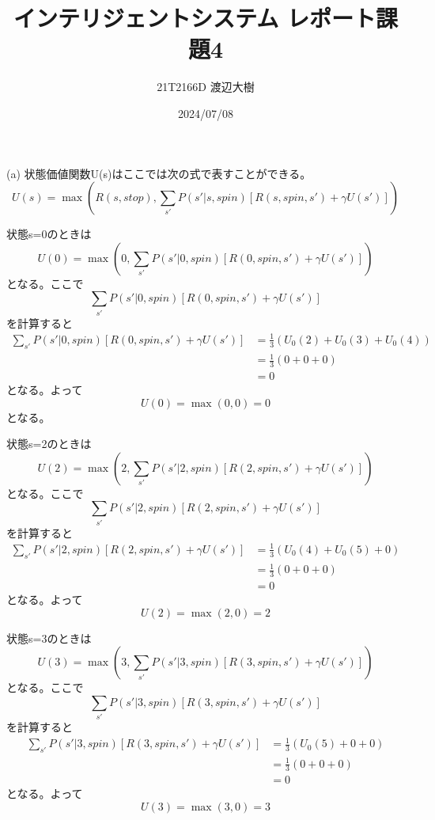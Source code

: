 \documentclass[a4paper,11pt,dvipdfmx]{jsarticle}
\begin{document}
\title{インテリジェントシステム レポート課題4}
\author{21T2166D 渡辺大樹}
\date{2024/07/08}
\maketitle

\section{}
(a)
状態価値関数U(s)はここでは次の式で表すことができる。
\[U(s)=\max(R(s,stop), \sum_{s'}P(s'|s,spin)[R(s,spin,s')+\gamma U(s')])\]

状態s=0のときは
\[U(0)=\max(0, \sum_{s'}P(s'|0,spin)[R(0,spin,s')+\gamma U(s')])\]
となる。ここで
\[\sum_{s'}P(s'|0,spin)[R(0,spin,s')+\gamma U(s')]\]
を計算すると
\begin{align*}
    \sum_{s'}P(s'|0,spin)[R(0,spin,s')+\gamma U(s')] &= \frac{1}{3}(U_0(2)+U_0(3)+U_0(4)) \\
                                                     &= \frac{1}{3}(0+0+0) \\
                                                     &= 0
\end{align*}
となる。よって
\[U(0)=\max(0,0)=0\]
となる。

状態s=2のときは
\[U(2)=\max(2, \sum_{s'}P(s'|2,spin)[R(2,spin,s')+\gamma U(s')])\]
となる。ここで
\[\sum_{s'}P(s'|2,spin)[R(2,spin,s')+\gamma U(s')]\]
を計算すると
\begin{align*}
    \sum_{s'}P(s'|2,spin)[R(2,spin,s')+\gamma U(s')] &= \frac{1}{3}(U_0(4)+U_0(5)+0) \\
                                                     &= \frac{1}{3}(0+0+0) \\
                                                     &= 0
\end{align*}
となる。よって
\[U(2)=\max(2,0)=2\]

状態s=3のときは
\[U(3)=\max(3, \sum_{s'}P(s'|3,spin)[R(3,spin,s')+\gamma U(s')])\]
となる。ここで
\[\sum_{s'}P(s'|3,spin)[R(3,spin,s')+\gamma U(s')]\]
を計算すると
\begin{align*}
    \sum_{s'}P(s'|3,spin)[R(3,spin,s')+\gamma U(s')] &= \frac{1}{3}(U_0(5)+0+0) \\
                                                     &= \frac{1}{3}(0+0+0) \\
                                                     &= 0
\end{align*}
となる。よって
\[U(3)=\max(3,0)=3\]
\end{document}
